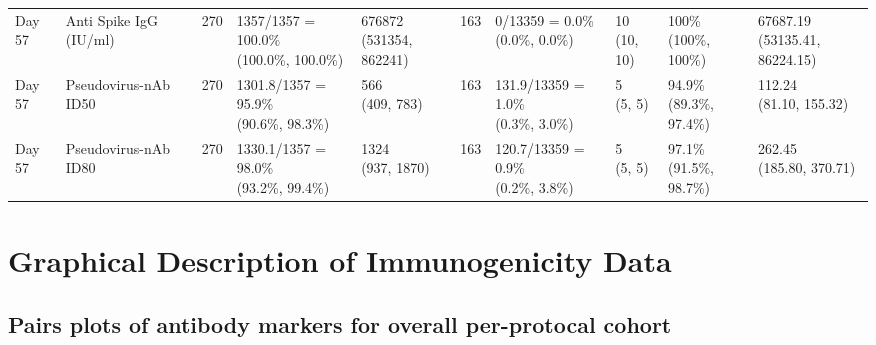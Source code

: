 \documentclass[]{book}
\theoremstyle{definition}
\theoremstyle{definition}
\theoremstyle{definition}
\newcommand{\1}{\mathbbm{1}}
\begin{document}
\begin{landscape}
\begin{ThreePartTable}
\begin{longtable}[t]{>{\raggedright\arraybackslash}p{1cm}lllllllll}
\addlinespace
Day 57 & Anti Spike IgG (IU/ml) & 270 & \makecell[l]{1357/1357 = 100.0\%\\(100.0\%, 100.0\%)} & \makecell[l]{676872\\(531354, 862241)} & 163 & \makecell[l]{0/13359 = 0.0\%\\(0.0\%, 0.0\%)} & \makecell[l]{10\\(10, 10)} & \makecell[l]{100\%\\(100\%, 100\%)} & \makecell[l]{67687.19\\(53135.41, 86224.15)}\\
Day 57 & Pseudovirus-nAb ID50 & 270 & \makecell[l]{1301.8/1357 = 95.9\%\\(90.6\%, 98.3\%)} & \makecell[l]{566\\(409, 783)} & 163 & \makecell[l]{131.9/13359 = 1.0\%\\(0.3\%, 3.0\%)} & \makecell[l]{5\\(5, 5)} & \makecell[l]{94.9\%\\(89.3\%, 97.4\%)} & \makecell[l]{112.24\\(81.10, 155.32)}\\
Day 57 & Pseudovirus-nAb ID80 & 270 & \makecell[l]{1330.1/1357 = 98.0\%\\(93.2\%, 99.4\%)} & \makecell[l]{1324\\(937, 1870)} & 163 & \makecell[l]{120.7/13359 = 0.9\%\\(0.2\%, 3.8\%)} & \makecell[l]{5\\(5, 5)} & \makecell[l]{97.1\%\\(91.5\%, 98.7\%)} & \makecell[l]{262.45\\(185.80, 370.71)}\\*
\end{longtable}
\end{ThreePartTable}


\clearpage
\end{landscape}

\hypertarget{immuno-graphical}{%
\chapter{Graphical Description of Immunogenicity Data}\label{immuno-graphical}}

\hypertarget{pairs-plots-of-antibody-markers-for-overall-per-protocal-cohort}{%
\section{Pairs plots of antibody markers for overall per-protocal cohort}\label{pairs-plots-of-antibody-markers-for-overall-per-protocal-cohort}}
\end{document}
